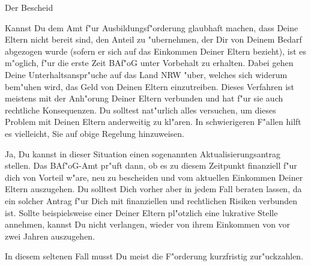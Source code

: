 \begin{artikel}{Der Bescheid}
\vspace*{-1ex}


Kannst Du dem Amt f"ur Ausbildungsf"orderung glaubhaft machen, dass Deine Eltern nicht bereit sind, den Anteil zu "ubernehmen, der Dir von Deinem Bedarf abgezogen wurde (sofern er sich auf das Einkommen Deiner Eltern bezieht), ist es m"oglich, f"ur die erste Zeit BAf"oG unter Vorbehalt zu erhalten. Dabei gehen Deine Unterhaltsanspr"uche auf das Land NRW "uber, welches sich widerum bem"uhen wird, das Geld von Deinen Eltern einzutreiben. Dieses Verfahren ist meistens mit der Anh"orung Deiner Eltern verbunden und hat f"ur sie auch rechtliche Konsequenzen. Du solltest nat"urlich alles versuchen, um dieses Problem mit Deinen Eltern anderweitig zu kl"aren. In schwierigeren F"allen hilft es vielleicht, Sie auf obige Regelung hinzuweisen. 

\vfill

Ja, Du kannst in dieser Situation einen sogenannten Aktualisierungsantrag stellen. Das BAf"oG-Amt pr"uft dann, ob es zu diesem Zeitpunkt finanziell f"ur dich von Vorteil w"are, neu zu bescheiden und vom aktuellen Einkommen Deiner Eltern auszugehen. Du solltest Dich vorher aber in jedem Fall beraten lassen, da ein solcher Antrag f"ur Dich mit finanziellen und rechtlichen Risiken verbunden ist. 
Sollte beispielsweise einer Deiner Eltern pl"otzlich eine lukrative Stelle annehmen, kannst Du nicht verlangen, wieder von ihrem Einkommen von vor zwei Jahren auszugehen.

 In diesem seltenen Fall musst Du meist die F"orderung kurzfristig zur"uckzahlen.
\end{artikel}
